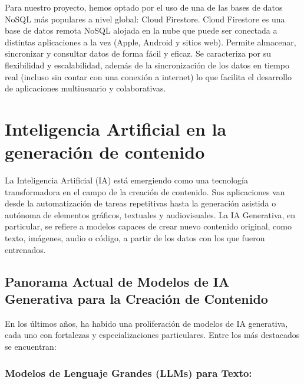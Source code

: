 \documentclass[12pt,a4paper]{report}
\begin{document}
Para nuestro proyecto, hemos optado por el uso de una de las bases de datos NoSQL más populares a nivel global: Cloud Firestore. Cloud Firestore es una base de datos remota NoSQL alojada en la nube que puede ser conectada a distintas aplicaciones a la vez (Apple, Android y sitios web). Permite almacenar, sincronizar y consultar datos de forma fácil y eficaz. Se caracteriza por su flexibilidad y escalabilidad, además de la sincronización de los datos en tiempo real (incluso sin contar con una conexión a internet) lo que facilita el desarrollo de aplicaciones multiusuario y colaborativas.

\section{Inteligencia Artificial en la generación de contenido}

La Inteligencia Artificial (IA) está emergiendo como una tecnología transformadora en el campo de la creación de contenido. Sus aplicaciones van desde la automatización de tareas repetitivas hasta la generación asistida o autónoma de elementos gráficos, textuales y audiovisuales. La IA Generativa, en particular, se refiere a modelos capaces de crear nuevo contenido original, como texto, imágenes, audio o código, a partir de los datos con los que fueron entrenados.

\subsection{Panorama Actual de Modelos de IA Generativa para la Creación de Contenido}

En los últimos años, ha habido una proliferación de modelos de IA generativa, cada uno con fortalezas y especializaciones particulares. Entre los más destacados se encuentran:

\subsubsection{Modelos de Lenguaje Grandes (LLMs) para Texto:}
\end{document}
